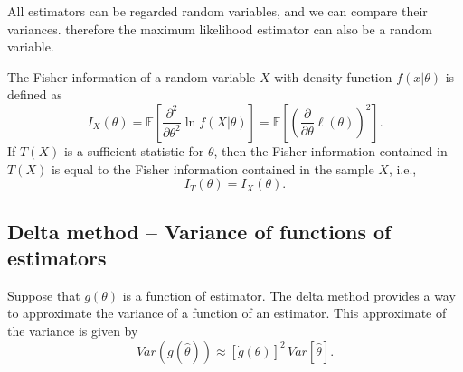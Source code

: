 All estimators can be regarded random variables, and we can compare their variances.
therefore the maximum likelihood estimator can also be a random variable.

\begin{definition}
    The Fisher information of a random variable $X$ with density function $f(x|\theta)$ is defined as
    \[
        I_X(\theta) = \mathbb{E}\left[\frac{\partial^2}{\partial \theta^2} \ln f(X|\theta) \right] = \mathbb{E}\left[ \left( \frac{\partial}{\partial \theta} \ell(\theta) \right)^2 \right].
    \]
    If $T(X)$ is a sufficient statistic for $\theta$, then the Fisher information contained in $T(X)$ is equal to the Fisher information contained in the sample $X$, i.e.,
    \[
        I_T(\theta) = I_X(\theta).
    \]
\end{definition}

\subsection{Delta method -- Variance of functions of estimators}

\begin{theorem}
    Suppose that $g(\theta)$ is a function of estimator.
    The delta method provides a way to approximate the variance of a function of an estimator.
    This approximate of the variance is given by
    \begin{equation}
        Var(g(\hat{\theta})) \approx [\dot{g}(\theta)]^2\, Var[\hat{\theta}].
    \end{equation}
\end{theorem}

